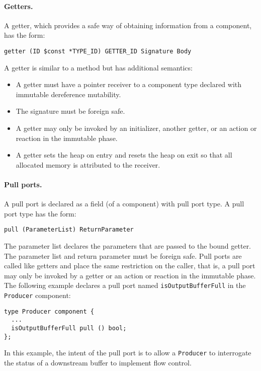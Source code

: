 \paragraph{Getters.}
A getter, which provides a safe way of obtaining information from a component, has the form:
\begin{verbatim}
getter (ID $const *TYPE_ID) GETTER_ID Signature Body
\end{verbatim}
A getter is similar to a method but has additional semantics:
\begin{itemize}
\item A getter must have a pointer receiver to a component type declared with immutable dereference mutability.
\item The signature must be foreign safe.
\item A getter may only be invoked by an initializer, another getter, or an action or reaction in the immutable phase.
\item A getter sets the heap on entry and resets the heap on exit so that all allocated memory is attributed to the receiver.
\end{itemize}

\paragraph{Pull ports.}
A pull port is declared as a field (of a component) with pull port type.
A pull port type has the form:
\begin{verbatim}
pull (ParameterList) ReturnParameter
\end{verbatim}
The parameter list declares the parameters that are passed to the bound getter.
The parameter list and return parameter must be foreign safe.
Pull ports are called like getters and place the same restriction on the caller, that is, a pull port may only be invoked by a getter or an action or reaction in the immutable phase.
The following example declares a pull port named \verb+isOutputBufferFull+ in the \verb+Producer+ component:
\begin{verbatim}
type Producer component {
  ...
  isOutputBufferFull pull () bool;
};
\end{verbatim}
In this example, the intent of the pull port is to allow a \verb+Producer+ to interrogate the status of a downstream buffer to implement flow control.

